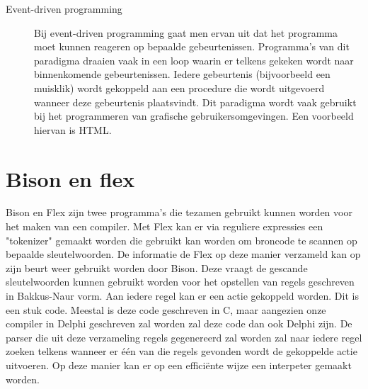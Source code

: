 \documentclass[11pt,a4paper]{article}
\begin{document}
\begin{description}
\item[Event-driven programming] Bij event-driven programming gaat men ervan uit dat het programma moet kunnen reageren op bepaalde gebeurtenissen. Programma's van dit paradigma draaien vaak in een loop waarin er telkens gekeken wordt naar binnenkomende gebeurtenissen. Iedere gebeurtenis (bijvoorbeeld een muisklik) wordt gekoppeld aan een procedure die wordt uitgevoerd wanneer deze gebeurtenis plaatsvindt. Dit paradigma wordt vaak gebruikt bij het programmeren van grafische gebruikersomgevingen. Een voorbeeld hiervan is HTML.

\end{description}


\section{Bison en flex}
Bison en Flex zijn twee programma's die tezamen gebruikt kunnen worden voor het maken van een compiler. Met Flex kan er via reguliere expressies een "tokenizer" gemaakt worden die gebruikt kan worden om broncode te scannen op bepaalde sleutelwoorden. De informatie de Flex op deze manier verzameld kan op zijn beurt weer gebruikt worden door Bison. Deze vraagt de gescande sleutelwoorden kunnen gebruikt worden voor het opstellen van regels geschreven in Bakkus-Naur vorm. Aan iedere regel kan er een actie gekoppeld worden. Dit is een stuk code. Meestal is deze code geschreven in C, maar aangezien onze compiler in Delphi geschreven zal worden zal deze code dan ook Delphi zijn. De parser die uit deze verzameling regels gegenereerd zal worden zal naar iedere regel zoeken telkens wanneer er één van die regels gevonden wordt de gekoppelde actie uitvoeren. Op deze manier kan er op een efficiënte wijze een interpeter gemaakt worden.
\end{document}
